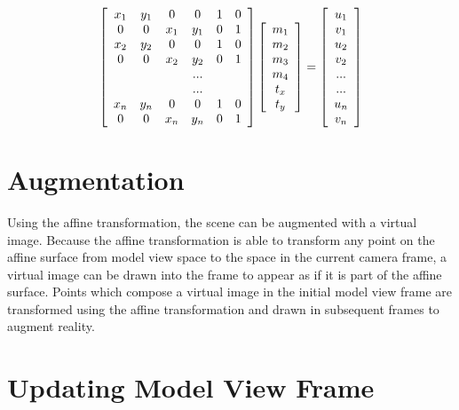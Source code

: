 \documentclass[oneside,11pt]{Latex/Classes/PhDthesisPSnPDF}
\begin{document}
\begin{equation} 
\label{eq_affine_solve}
\left[
  \begin{array}{ c c c c c c }
     x_1 & y_1 & 0 & 0 & 1 & 0 \\
     0 & 0 & x_1 & y_1 & 0 & 1 \\
     x_2 & y_2 & 0 & 0 & 1 & 0 \\
     0 & 0 & x_2 & y_2 & 0 & 1 \\
     & & & ... & & \\
     & & & ... & & \\
     x_n & y_n & 0 & 0 & 1 & 0 \\
     0 & 0 & x_n & y_n & 0 & 1
  \end{array} 
\right]
\left[
  \begin{array}{ c }
     m_1 \\
     m_2 \\
     m_3 \\
     m_4 \\
     t_x \\
     t_y
  \end{array} 
\right]
=
\left[
  \begin{array}{ c }
     u_1 \\
     v_1 \\
     u_2 \\
     v_2 \\
     ... \\
     ... \\
     u_n \\
     v_n
  \end{array} 
\right]
\end{equation}

\section{Augmentation}

Using the affine transformation, the scene can be augmented with a virtual image.  Because the affine transformation is able to transform any point on the affine surface from model view space to the space in the current camera frame, a virtual image can be drawn into the frame to appear as if it is part of the affine surface.  Points which compose a virtual image in the initial model view frame are transformed using the affine transformation and drawn in subsequent frames to augment reality. 

\section{Updating Model View Frame}
\end{document}
